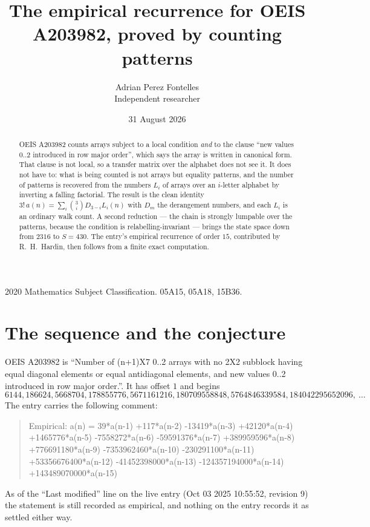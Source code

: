 \documentclass[11pt,a4paper]{article}
\title{The empirical recurrence for OEIS A203982, proved by counting patterns}
\author{Adrian Perez Fontelles\\ \small Independent researcher}
\date{31 August 2026}
\theoremstyle{plain}
\theoremstyle{definition}
\begin{document}
\maketitle

\begin{abstract}
OEIS A203982 counts arrays subject to a local condition \emph{and} to the clause ``new values
$0..2$ introduced in row major order'', which says the array is written in canonical
form. That clause is not local, so a transfer matrix over the alphabet does not see it. It
does not have to: what is being counted is not arrays but equality patterns, and the number
of patterns is recovered from the numbers $L_i$ of arrays over an $i$-letter alphabet by
inverting a falling factorial. The result is the clean identity
$3!\,a(n)=\sum_i\binom{3}{i}D_{3-i}L_i(n)$ with $D_m$ the derangement numbers,
and each $L_i$ is an ordinary walk count. A second reduction --- the chain is strongly
lumpable over the patterns, because the condition is relabelling-invariant --- brings the
state space down from $2316$ to $S=430$. The entry's empirical recurrence of order
$15$, contributed by R.~H.~Hardin, then follows from a finite exact computation.
\end{abstract}

\noindent\small 2020 Mathematics Subject Classification. 05A15, 05A18, 15B36.\normalsize

\section{The sequence and the conjecture}

OEIS A203982 is ``Number of (n+1)X7 0..2 arrays with no 2X2 subblock having equal diagonal elements or equal antidiagonal elements, and new values 0..2 introduced in row major order.''. It has offset $1$ and begins
\[
6144, 186624, 5668704, 178855776, 5671161216, 180709558848, 5764846339584, 184042295652096,\ \dots
\]
The entry carries the following comment:
\begin{quote}\small
Empirical: a(n) = 39*a(n-1) +117*a(n-2) -13419*a(n-3) +42120*a(n-4) +1465776*a(n-5) -7558272*a(n-6) -59591376*a(n-7) +389959596*a(n-8) +776691180*a(n-9) -7353962460*a(n-10) -230291100*a(n-11) +53356676400*a(n-12) -41452398000*a(n-13) -124357194000*a(n-14) +143489070000*a(n-15)
\end{quote}
As of the ``Last modified'' line on the live entry (Oct 03 2025 10:55:52, revision 9) the statement is
still recorded as empirical, and nothing on the entry records it as settled either way.
\end{document}
